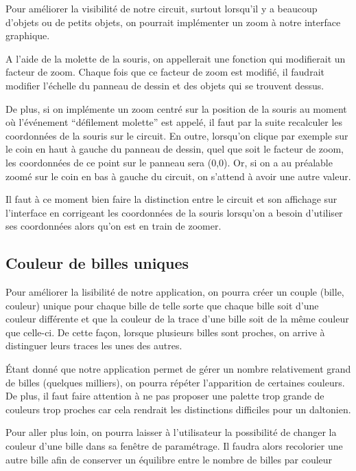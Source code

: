 \documentclass{report}
\begin{document}
Pour améliorer la visibilité de notre circuit, surtout lorsqu’il y a beaucoup d’objets ou de petits objets, on pourrait implémenter un zoom à notre interface graphique. 

A l’aide de la molette de la souris, on appellerait une fonction qui modifierait un facteur de zoom. Chaque fois que ce facteur de zoom est modifié, il faudrait modifier l’échelle du panneau de dessin et des objets qui se trouvent dessus. 

De plus, si on implémente un zoom centré sur la position de la souris au moment où l’événement “défilement molette” est appelé, il faut par la suite recalculer les coordonnées de la souris sur le circuit. En outre, lorsqu’on clique par exemple sur le coin en haut à gauche du panneau de dessin, quel que soit le facteur de zoom, les coordonnées de ce point sur le panneau sera (0,0). Or, si on a au préalable zoomé sur le coin en bas à gauche du circuit, on s’attend à avoir une autre valeur. 

Il faut à ce moment bien faire la distinction entre le circuit et son affichage sur l’interface en corrigeant les coordonnées de la souris lorsqu’on a besoin d’utiliser ses coordonnées alors qu’on est en train de zoomer.


\subsection{Couleur de billes uniques}

Pour améliorer la lisibilité de notre application, on pourra créer un couple (bille, couleur) unique pour chaque bille de telle sorte que chaque bille soit d’une couleur différente et que la couleur de la trace d’une bille soit de la même couleur que celle-ci. De cette façon, lorsque plusieurs billes sont proches, on arrive à distinguer leurs traces les unes des autres. 

Étant donné que notre application permet de gérer un nombre relativement grand de billes (quelques milliers), on pourra répéter l’apparition de certaines couleurs. De plus, il faut faire attention à ne pas proposer une palette trop grande de couleurs trop proches car cela rendrait les distinctions difficiles pour un daltonien.

Pour aller plus loin, on pourra laisser à l’utilisateur la possibilité de changer la couleur d’une bille dans sa fenêtre de paramétrage. Il faudra alors recolorier une autre bille afin de conserver un équilibre entre le nombre de billes par couleur
\end{document}
